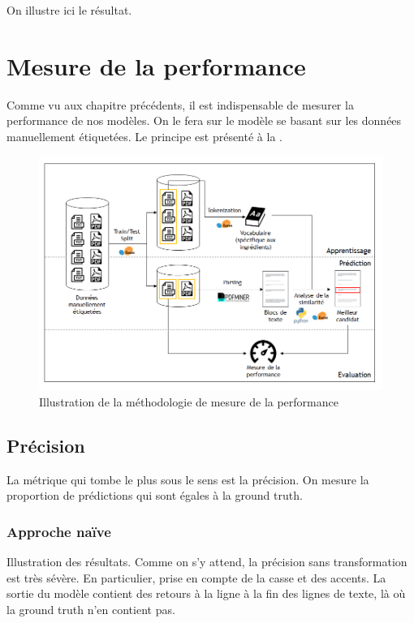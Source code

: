         On illustre ici le résultat.

    \chapter{Mesure de la performance}
    
    Comme vu aux chapitre précédents, il est indispensable de mesurer la performance de nos modèles.
    On le fera sur le modèle se basant sur les données manuellement étiquetées.
    Le principe est présenté à la .

    \begin{figure}[htbp]
        \begin{center}
        \includegraphics[width=0.9\linewidth]{img/measured_model.png}
        \end{center}
        \caption{Illustration de la méthodologie de mesure de la performance}
        \label{fig:measured_model}
    \end{figure}     

        \section{Précision}
        
        La métrique qui tombe le plus sous le sens est la précision.
        On mesure la proportion de prédictions qui sont égales à la ground truth.

            \subsection{Approche naïve}

            Illustration des résultats. 
            Comme on s'y attend, la précision sans transformation est très sévère.
            En particulier, prise en compte de la casse et des accents.
            La sortie du modèle contient des retours à la ligne à la fin des lignes de texte, là où la ground truth n'en contient pas.

